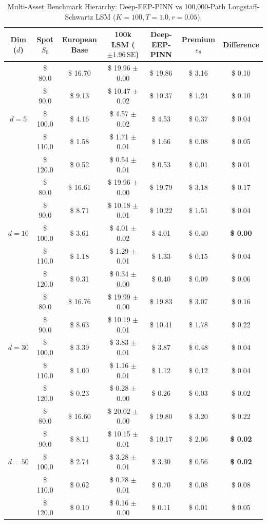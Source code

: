 \documentclass[11pt,a4paper]{article}
\begin{document}
\begin{table}[htbp]
\centering
\small
\caption{Multi-Asset Benchmark Hierarchy: Deep-EEP-PINN vs 100,000-Path Longstaff-Schwartz LSM ($K=100, T=1.0, r=0.05$).}
\label{tab:multid_scaling_hierarchy}
\begin{tabular}{@{}ccccccc@{}}
\toprule
\textbf{Dim ($d$)} & \textbf{Spot $S_0$} & \textbf{European Base} & \textbf{100k LSM ($\pm 1.96\,\text{SE}$)} & \textbf{Deep-EEP-PINN} & \textbf{Premium $e_\theta$} & \textbf{Difference} \\ \midrule
\multirow{5}{*}{$d=5$} 
& \$ 80.0  & \$ 16.70 & \$ 19.96 $\pm$ 0.00 & \$ 19.86 & \$ 3.16 & \$ 0.10 \\
& \$ 90.0  & \$ 9.13  & \$ 10.47 $\pm$ 0.02 & \$ 10.37 & \$ 1.24 & \$ 0.10 \\
& \$ 100.0 & \$ 4.16  & \$ 4.57 $\pm$ 0.02  & \$ 4.53  & \$ 0.37 & \$ 0.04 \\
& \$ 110.0 & \$ 1.58  & \$ 1.71 $\pm$ 0.01  & \$ 1.66  & \$ 0.08 & \$ 0.05 \\
& \$ 120.0 & \$ 0.52  & \$ 0.54 $\pm$ 0.01  & \$ 0.53  & \$ 0.01 & \$ 0.01 \\ \midrule
\multirow{5}{*}{$d=10$}
& \$ 80.0  & \$ 16.61 & \$ 19.96 $\pm$ 0.00 & \$ 19.79 & \$ 3.18 & \$ 0.17 \\
& \$ 90.0  & \$ 8.71  & \$ 10.18 $\pm$ 0.01 & \$ 10.22 & \$ 1.51 & \$ 0.04 \\
& \$ 100.0 & \$ 3.61  & \$ 4.01 $\pm$ 0.02  & \$ 4.01  & \$ 0.40 & \textbf{\$ 0.00} \\
& \$ 110.0 & \$ 1.18  & \$ 1.29 $\pm$ 0.01  & \$ 1.33  & \$ 0.15 & \$ 0.04 \\
& \$ 120.0 & \$ 0.31  & \$ 0.34 $\pm$ 0.00  & \$ 0.40  & \$ 0.09 & \$ 0.06 \\ \midrule
\multirow{5}{*}{$d=30$}
& \$ 80.0  & \$ 16.76 & \$ 19.99 $\pm$ 0.00 & \$ 19.83 & \$ 3.07 & \$ 0.16 \\
& \$ 90.0  & \$ 8.63  & \$ 10.19 $\pm$ 0.01 & \$ 10.41 & \$ 1.78 & \$ 0.22 \\
& \$ 100.0 & \$ 3.39  & \$ 3.83 $\pm$ 0.01  & \$ 3.87  & \$ 0.48 & \$ 0.04 \\
& \$ 110.0 & \$ 1.00  & \$ 1.16 $\pm$ 0.01  & \$ 1.12  & \$ 0.12 & \$ 0.04 \\
& \$ 120.0 & \$ 0.23  & \$ 0.28 $\pm$ 0.00  & \$ 0.26  & \$ 0.03 & \$ 0.02 \\ \midrule
\multirow{5}{*}{\textbf{$d=50$}}
& \$ 80.0  & \$ 16.60 & \$ 20.02 $\pm$ 0.00 & \$ 19.80 & \$ 3.20 & \$ 0.22 \\
& \$ 90.0  & \$ 8.11  & \$ 10.15 $\pm$ 0.01 & \$ 10.17 & \$ 2.06 & \textbf{\$ 0.02} \\
& \$ 100.0 & \$ 2.74  & \$ 3.28 $\pm$ 0.01  & \$ 3.30  & \$ 0.56 & \textbf{\$ 0.02} \\
& \$ 110.0 & \$ 0.62  & \$ 0.78 $\pm$ 0.01  & \$ 0.70  & \$ 0.08 & \$ 0.08 \\
& \$ 120.0 & \$ 0.10  & \$ 0.16 $\pm$ 0.00  & \$ 0.11  & \$ 0.01 & \$ 0.05 \\ \bottomrule
\end{tabular}
\end{table}
\end{document}
